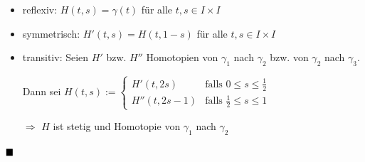 \begin{beweis}\leavevmode
    \begin{itemize}
        \item reflexiv: $H(t,s) = \gamma(t)$ für alle $t,s \in I \times I$
        \item symmetrisch: $H'(t,s) = H(t,1-s)$ für alle $t,s \in I \times I$
        \item transitiv: Seien $H'$ bzw. $H''$ Homotopien von $\gamma_1$
              nach $\gamma_2$ bzw. von $\gamma_2$ nach $\gamma_3$.

              Dann sei $H(t,s) := \begin{cases}
              H'(t, 2s)    &\text{falls } 0 \leq s \leq \frac{1}{2}\\
              H''(t, 2s-1) &\text{falls } \frac{1}{2} \leq s \leq 1\end{cases}$

              $\Rightarrow$ $H$ ist stetig und Homotopie von $\gamma_1$ nach 
              $\gamma_2$
    \end{itemize}
    $\qed$
\end{beweis}


